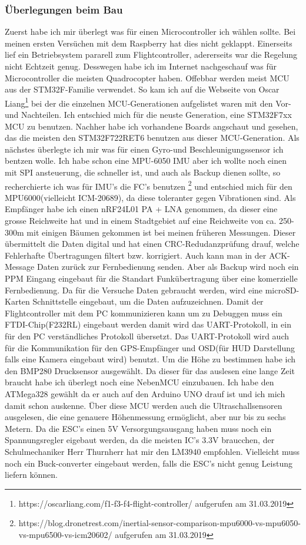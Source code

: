 \documentclass[12pt,a4paper, ngerman]{article}
\begin{document}
\subsubsection{Überlegungen beim Bau}
Zuerst habe ich mir überlegt was für einen Microcontroller ich wählen sollte. Bei meinen ersten Versüchen mit dem Raspberry hat dies nicht geklappt. Einerseits lief ein Betriebsystem pararell zum Flightcontroller, adererseits war die Regelung nicht Echtzeit genug. Desswegen habe ich im Internet nachgeschauf was für Microcontroller die meisten Quadrocopter haben. Offebbar werden meist MCU aus der STM32F-Familie verwendet. So kam ich auf die Webseite von Oscar Liang\footnote{\label{foot:1}https://oscarliang.com/f1-f3-f4-flight-controller/ aufgerufen am 31.03.2019} bei der die einzelnen MCU-Generationen aufgelistet waren mit den Vor-und Nachteilen. Ich entschied mich für die neuste Generation, eine STM32F7xx MCU zu benutzen. Nachher habe ich vorhandene Boards angschaut und gesehen, das die meisten den STM32F722RET6 benutzen aus dieser MCU-Generation. Als nächstes überlegte ich mir was für einen Gyro-und Beschleunigungssensor ich bentzen wolle. Ich habe schon eine MPU-6050 IMU aber ich wollte noch einen mit SPI ansteuerung, die schneller ist, und auch als Backup dienen sollte, so recherchierte ich was für IMU's die FC's benutzen \footnote{\label{foot:2}https://blog.dronetrest.com/inertial-sensor-comparison-mpu6000-vs-mpu6050-vs-mpu6500-vs-icm20602/ aufgerufen am 31.03.2019} und entschied mich für den MPU6000(vielleicht ICM-20689), da diese toleranter gegen Vibrationen sind. Als Empfänger habe ich einen nRF24L01 PA + LNA genommen, da dieser eine grosse Reichweite hat und in einem Stadtgebiet auf eine Reichweite von ca. 250-300m mit einigen Bäumen gekommen ist bei meinen früheren Messungen. Dieser übermittelt die Daten digital und hat einen CRC-Redudanzprüfung drauf, welche Fehlerhafte Übertragungen filtert bzw. korrigiert. Auch kann man in der ACK-Message Daten zurück zur Fernbedienung senden. Aber als Backup wird noch ein PPM Eingang eingebaut für die Standart Funkübertragung über eine komerzielle Fernbedienung. Da für die Versuche Daten gebraucht werden, wird eine microSD-Karten Schnittstelle eingebaut, um die Daten aufzuzeichnen. Damit der Flightcontroller mit dem PC kommunizieren kann um zu Debuggen muss ein FTDI-Chip(F232RL) eingebaut werden damit wird das UART-Protokoll, in ein für den PC verständliches Protokoll übersetzt. Das UART-Protokoll wird auch für die Kommunikation für den GPS-Empfänger und OSD(für HUD Darstellung falls eine Kamera eingebaut wird) benutzt. Um die Höhe zu bestimmen habe ich den BMP280 Drucksensor ausgewählt. Da dieser für das auslesen eine lange Zeit braucht habe ich überlegt noch eine NebenMCU einzubauen. Ich habe den ATMega328 gewählt da er auch auf den Arduino UNO drauf ist und ich mich damit schon auskenne. Über diese MCU werden auch die Ultraschallsensoren ausgelesen, die eine genauere Höhenmessung ermöglicht, aber nur bis zu sechs Metern. Da die ESC's einen 5V Versorgungsausgang haben muss noch ein Spannungsregler  eigebaut werden, da die meisten IC's 3.3V braucchen, der Schulmechaniker Herr Thurnherr hat mir den LM3940 empfohlen. Vielleicht muss noch ein Buck-converter eingebaut  werden, falls die ESC's nicht genug Leistung liefern können.
\end{document}
